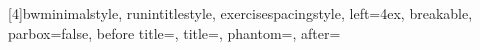 % 
% 
% 
% 
% 
% 
% 
% 
% 
% 
[4]{bwminimalstyle, runintitlestyle, exercisespacingstyle, left=4ex, breakable, parbox=false, before title={\hspace{-4ex}}, title={}, phantom={\hypertarget{#4}{}},  after={}}


\reversemarginpar


